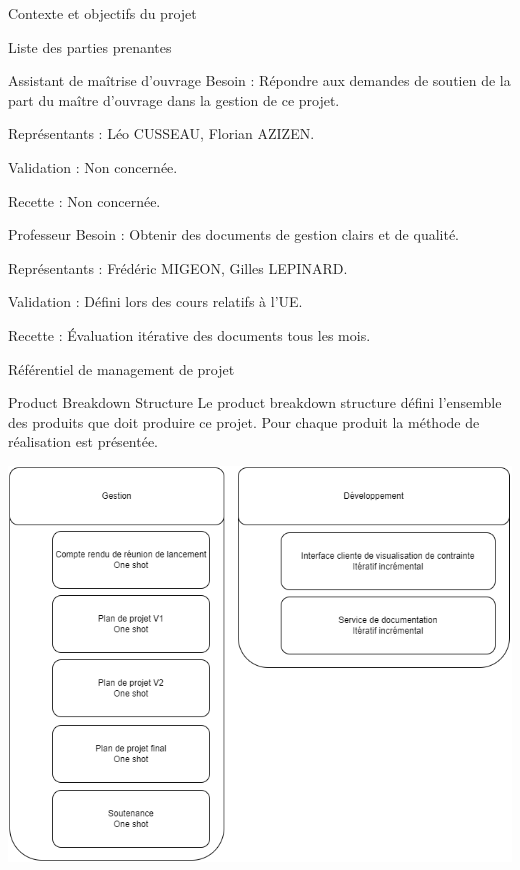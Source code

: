 \documentclass[]{article}
\begin{document}
{\begin{section}{\label{sec:Contexte et objectifs du projet}Contexte et objectifs du projet}
\begin{subsection}{\label{sec:Liste des parties prenantes}Liste des parties prenantes}
         \begin{subsubsection}{\label{sec:Assistant de maîtrise d’ouvrage}Assistant de maîtrise d’ouvrage}
             Besoin : Répondre aux demandes de soutien de la part du maître d'ouvrage dans la gestion de ce projet.

             Représentants : Léo CUSSEAU, Florian AZIZEN.

             Validation : Non concernée.

             Recette : Non concernée.
         \end{subsubsection}

         \begin{subsubsection}{\label{sec:Professeur}Professeur}
             Besoin : Obtenir des documents de gestion clairs et de qualité.

             Représentants : Frédéric MIGEON, Gilles LEPINARD.

             Validation : Défini lors des cours relatifs à l’UE.

             Recette : Évaluation itérative des documents tous les mois.
         \end{subsubsection}
     \end{subsection}
    \end{section}

    \newpage

    \begin{section}{\label{sec:Référentiel de management de projet}Référentiel de management de projet}
     \begin{subsection}{\label{sec:Product Breakdown Structure}Product Breakdown Structure}
         Le product breakdown structure défini l’ensemble des produits que doit produire ce projet. Pour chaque produit la méthode de réalisation est présentée.

         \includegraphics[scale=0.4]{documents/IMG/PBS}
     \end{subsection} 


\end{section}}
\end{document}
